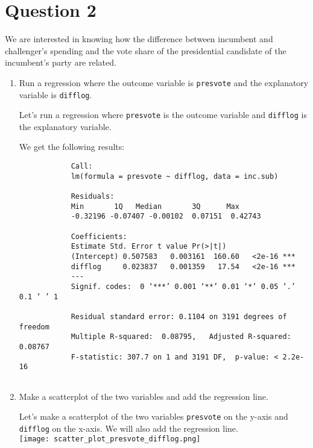 \documentclass[12pt,letterpaper]{article}
\begin{document}
\section*{Question 2}
\noindent We are interested in knowing how the difference between incumbent and challenger's spending and the vote share of the presidential candidate of the incumbent's party are related.	\vspace{.25cm}
	\begin{enumerate}
		\item Run a regression where the outcome variable is \texttt{presvote} and the explanatory variable is \texttt{difflog}.	
		
		Let's run a regression where \texttt{presvote} is the outcome variable and \texttt{difflog} is the explanatory variable.
		
		
		We get the following results:
		
		\begin{verbatim}
			Call:
			lm(formula = presvote ~ difflog, data = inc.sub)
			
			Residuals:
			Min       1Q   Median       3Q      Max 
			-0.32196 -0.07407 -0.00102  0.07151  0.42743 
			
			Coefficients:
			Estimate Std. Error t value Pr(>|t|)    
			(Intercept) 0.507583   0.003161  160.60   <2e-16 ***
			difflog     0.023837   0.001359   17.54   <2e-16 ***
			---
			Signif. codes:  0 ‘***’ 0.001 ‘**’ 0.01 ‘*’ 0.05 ‘.’ 0.1 ‘ ’ 1
			
			Residual standard error: 0.1104 on 3191 degrees of freedom
			Multiple R-squared:  0.08795,	Adjusted R-squared:  0.08767 
			F-statistic: 307.7 on 1 and 3191 DF,  p-value: < 2.2e-16	
			
		\end{verbatim}
		
		\vspace{5cm}
		\item Make a scatterplot of the two variables and add the regression line. 	
		
		Let's make a scatterplot of the two variables \texttt{presvote} on the y-axis and \texttt{difflog} on the x-axis. We will also add the regression line. \\
		
		
		\texttt{[image: scatter\_plot\_presvote\_difflog.png]}
		

\end{enumerate}
\end{document}
